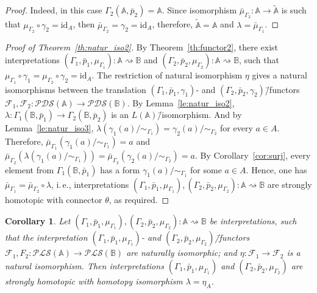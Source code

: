 \documentclass[12pt]{article}
\newtheorem{corollary}{Corollary}
\theoremstyle{definition}
\def\MA{{\mathbb{A}}}
\def\MB{{\mathbb{B}}}
\newcommand{\nsA}{\widetilde{\mathbb A}}
\def\F{{\mathcal{F}}}
\def\PLS{{\mathcal{PLS}}}
\def\PDS{{\mathcal{PDS}}}
\def\id{{\mathrm{id}}}
\begin{document}
\begin{proof}
Indeed, in this case $\Gamma_2(\MA,\bar p_2)=\MA$. Since isomorphism $\bar\mu_{\Gamma_2}\colon \MA\to \nsA$ is such that $\mu_{\Gamma_2}\circ\gamma_2=\id_A$, then $\bar\mu_{\Gamma_2}=\gamma_2=\id_A$, therefore, $\nsA=\MA$ and $\lambda=\bar\mu_{\Gamma_1}$.
\end{proof}

\begin{proof}[Proof of Theorem~\ref{th:natur_iso2}]
By Theorem~\ref{th:functor2}, there exist interpretations $(\Gamma_1,\bar p_1,\mu_{\Gamma_1})\colon \MA\rightsquigarrow \MB$ and $(\Gamma_2,\bar p_2,\mu_{\Gamma_2})\colon \MA\rightsquigarrow \MB$, such that $\mu_{\Gamma_1}\circ\gamma_1=\mu_{\Gamma_2}\circ\gamma_2=\id_A$. The restriction of natural isomorphism $\eta$ gives a natural isomorphisms between the translation $(\Gamma_1,\bar p_1,\gamma_1)$- and $(\Gamma_2,\bar p_2,\gamma_2)$\=/functors $\F_1,\F_2\colon \PDS(\MA)\to\PDS(\MB)$. By Lemma~\ref{le:natur_iso2}, $\lambda\colon\Gamma_1(\MB,\bar p_1)\to \Gamma_2(\MB,\bar p_2)$ is an $L(\MA)$\=/isomorphism. And by Lemma~\ref{le:natur_iso3}, $\lambda(\gamma_1(a)/{\sim_{\Gamma_1}})=\gamma_2(a)/{\sim_{\Gamma_2}}$ for every $a\in A$. Therefore, $\bar\mu_{\Gamma_1}(\gamma_1(a)/{\sim_{\Gamma_1}})=a$ and $\bar\mu_{\Gamma_2}(\lambda(\gamma_1(a)/{\sim_{\Gamma_1}}))=\bar\mu_{\Gamma_2}(\gamma_2(a)/{\sim_{\Gamma_2}})=a$. By Corollary~\ref{cor:surj}, every element from $\Gamma_1(\MB,\bar p_1)$ has a form $\gamma_1(a)/{\sim_{\Gamma_1}}$ for some $a\in A$. Hence, one has $\bar\mu_{\Gamma_1}=\bar\mu_{\Gamma_2}\circ\lambda$, i.\,e., interpretations $(\Gamma_1,\bar p_1,\mu_{\Gamma_1}),(\Gamma_2,\bar p_2,\mu_{\Gamma_2})\colon \MA\rightsquigarrow \MB$ are strongly homotopic with connector $\theta$, as required. 
\end{proof}

\begin{corollary}\label{cor:natur_iso_inter}
Let $(\Gamma_1,\bar p_1,\mu_{\Gamma_1}),(\Gamma_2,\bar p_2,\mu_{\Gamma_2})\colon \MA\rightsquigarrow\MB$ be interpretations, such that the interpretation $(\Gamma_1,\bar p_1,\mu_{\Gamma_1})$- and $(\Gamma_2,\bar p_2,\mu_{\Gamma_2})$\=/functors $\F_1,F_2\colon\PLS(\MA)\to\PLS(\MB)$ are naturally isomorphic; and $\eta\colon\F_1\to\F_2$ is a natural isomorphism. Then interpretations $(\Gamma_1,\bar p_1,\mu_{\Gamma_1})$ and $(\Gamma_2,\bar p_2,\mu_{\Gamma_2})$ are strongly homotopic with homotopy isomorphism $\lambda=\eta_A$. 
\end{corollary}
\end{document}
